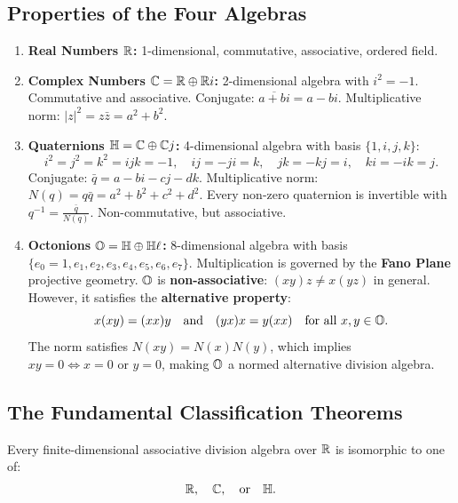 \subsection{Properties of the Four Algebras}

\begin{enumerate}[label=\textbf{(\arabic*)}, leftmargin=*, itemsep=6pt]
    \item \textbf{Real Numbers $\mathbb{R}$:} 1-dimensional, commutative, associative, ordered field.
    \item \textbf{Complex Numbers $\mathbb{C} = \mathbb{R} \oplus \mathbb{R} i$:} 2-dimensional algebra with $i^2 = -1$. Commutative and associative. Conjugate: $\overline{a+bi} = a-bi$. Multiplicative norm: $|z|^2 = z\bar{z} = a^2 + b^2$.
    \item \textbf{Quaternions $\mathbb{H} = \mathbb{C} \oplus \mathbb{C} j$:} 4-dimensional algebra with basis $\{1, i, j, k\}$:
    \begin{equation}
    i^2 = j^2 = k^2 = ijk = -1, \quad ij = -ji = k, \quad jk = -kj = i, \quad ki = -ik = j.
    \end{equation}
    Conjugate: $\bar{q} = a - bi - cj - dk$. Multiplicative norm: $N(q) = q\bar{q} = a^2 + b^2 + c^2 + d^2$.
    Every non-zero quaternion is invertible with $q^{-1} = \frac{\bar{q}}{N(q)}$. Non-commutative, but associative.
    \item \textbf{Octonions $\mathbb{O} = \mathbb{H} \oplus \mathbb{H} \ell$:} 8-dimensional algebra with basis $\{e_0 = 1, e_1, e_2, e_3, e_4, e_5, e_6, e_7\}$.
    Multiplication is governed by the \textbf{Fano Plane} projective geometry.
    $\mathbb{O}$ is \textbf{non-associative}: $(xy)z \ne x(yz)$ in general. However, it satisfies the \textbf{alternative property}:
    \begin{equation}
    x(xy) = (xx)y \quad \text{and} \quad (yx)x = y(xx) \quad \text{for all } x, y \in \mathbb{O}.
    \end{equation}
    The norm satisfies $N(xy) = N(x)N(y)$, which implies $xy = 0 \iff x = 0 \text{ or } y = 0$, making $\mathbb{O}$ a normed alternative division algebra.
\end{enumerate}

\subsection{The Fundamental Classification Theorems}

\begin{theorem}
\label{thm:frobenius}
Every finite-dimensional associative division algebra over $\mathbb{R}$ is isomorphic to one of:
\begin{equation}
\mathbb{R}, \quad \mathbb{C}, \quad \text{or} \quad \mathbb{H}.
\end{equation}
\end{theorem}

